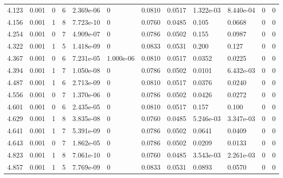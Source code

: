 \documentclass[preview]{standalone}
\begin{document}
{{{\begin{tabular}{L{1.2cm}C{1.2cm} C{0.3cm}C{0.5cm} C{1.4cm}C{1.4cm} C{1.4cm}C{1.4cm} C{1.6cm}C{1.6cm} C{1.6cm}C{1.6cm}}
  4.123  &  0.001  & 0     &  6 &  2.369e-06  & 0  &  0.0810&   0.0517& 1.322e-03 & 8.440e-04   &  0 & 0  \\ 
  4.156  &  0.001  & 1     &  8 &  7.723e-10  & 0  &  0.0760&   0.0485& 0.105 & 0.0668   &  0 & 0  \\ 
  4.254  &  0.001  & 0     &  7 &  4.909e-07  & 0  &  0.0786&   0.0502& 0.155 & 0.0987   &  0 & 0  \\ 
  4.322  &  0.001  & 1     &  5 &  1.418e-09  & 0  &  0.0833&   0.0531& 0.200 & 0.127   &  0 & 0  \\ 
  4.367  &  0.001  & 0     &  6 &  7.231e-05  & 1.000e-06  &  0.0810&   0.0517& 0.0352 & 0.0225   &  0 & 0  \\ 
  4.394  &  0.001  & 1     &  7 &  1.050e-08  & 0  &  0.0786&   0.0502& 0.0101 & 6.432e-03   &  0 & 0  \\ 
  4.487  &  0.001  & 1     &  6 &  2.713e-09  & 0  &  0.0810&   0.0517& 0.0376 & 0.0240   &  0 & 0  \\ 
  4.556  &  0.001  & 0     &  7 &  1.370e-06  & 0  &  0.0786&   0.0502& 0.0426 & 0.0272   &  0 & 0  \\ 
  4.601  &  0.001  & 0     &  6 &  2.435e-05  & 0  &  0.0810&   0.0517& 0.157 & 0.100   &  0 & 0  \\ 
  4.629  &  0.001  & 1     &  8 &  3.835e-08  & 0  &  0.0760&   0.0485& 5.246e-03 & 3.347e-03   &  0 & 0  \\ 
  4.641  &  0.001  & 1     &  7 &  5.391e-09  & 0  &  0.0786&   0.0502& 0.0641 & 0.0409   &  0 & 0  \\ 
  4.643  &  0.001  & 0     &  7 &  1.862e-05  & 0  &  0.0786&   0.0502& 0.0209 & 0.0133   &  0 & 0  \\ 
  4.823  &  0.001  & 1     &  8 &  7.061e-10  & 0  &  0.0760&   0.0485& 3.543e-03 & 2.261e-03   &  0 & 0  \\ 
  4.857  &  0.001  & 1     &  5 &  7.769e-09  & 0  &  0.0833&   0.0531& 0.0893 & 0.0570   &  0 & 0  \\ 
\hline 
\end{tabular} 

}}}
\end{document}

